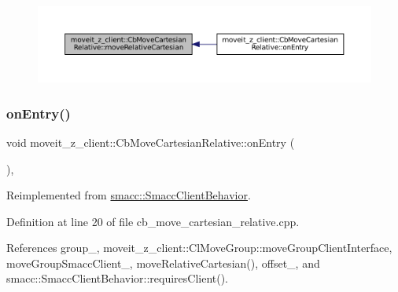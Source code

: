 \nopagebreak
\begin{figure}[H]
\begin{center}
\leavevmode
\includegraphics[width=350pt]{classmoveit__z__client_1_1CbMoveCartesianRelative_aa8535a52826c36b103abebba6da7737f_icgraph}
\end{center}
\end{figure}
\mbox{\label{classmoveit__z__client_1_1CbMoveCartesianRelative_aaea0e6c7431f93301a77269b8fa539f8}} 
\subsubsection{\texorpdfstring{on\+Entry()}{onEntry()}}
{\footnotesize\ttfamily void moveit\+\_\+z\+\_\+client\+::\+Cb\+Move\+Cartesian\+Relative\+::on\+Entry (\begin{DoxyParamCaption}{ }\end{DoxyParamCaption})\hspace{0.3cm}{\ttfamily [override]}, {\ttfamily [virtual]}}



Reimplemented from \hyperlink{classsmacc_1_1SmaccClientBehavior_a7962382f93987c720ad432fef55b123f}{smacc\+::\+Smacc\+Client\+Behavior}.



Definition at line 20 of file cb\+\_\+move\+\_\+cartesian\+\_\+relative.\+cpp.



References group\+\_\+, moveit\+\_\+z\+\_\+client\+::\+Cl\+Move\+Group\+::move\+Group\+Client\+Interface, move\+Group\+Smacc\+Client\+\_\+, move\+Relative\+Cartesian(), offset\+\_\+, and smacc\+::\+Smacc\+Client\+Behavior\+::requires\+Client().


